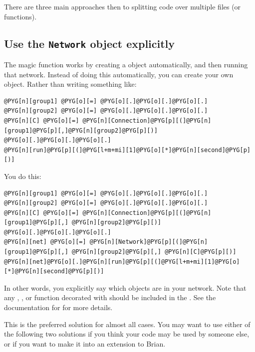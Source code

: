 \documentclass[letterpaper,10pt,english]{manual}
\begin{document}
There are three main approaches then to splitting code over multiple
files (or functions).

\hypertarget{index-120}{}\subsection{Use the \texttt{Network} object explicitly}

The magic \hyperlink{brian.run}{} function works by creating a \hyperlink{brian.Network}{}
object automatically, and then running that network. Instead of doing
this automatically, you can create your own \hyperlink{brian.Network}{} object.
Rather than writing something like:

\begin{Verbatim}[commandchars=@\[\]]
@PYG[n][group1] @PYG[o][=] @PYG[o][.]@PYG[o][.]@PYG[o][.]
@PYG[n][group2] @PYG[o][=] @PYG[o][.]@PYG[o][.]@PYG[o][.]
@PYG[n][C] @PYG[o][=] @PYG[n][Connection]@PYG[p][(]@PYG[n][group1]@PYG[p][,]@PYG[n][group2]@PYG[p][)]
@PYG[o][.]@PYG[o][.]@PYG[o][.]
@PYG[n][run]@PYG[p][(]@PYG[l+m+mi][1]@PYG[o][*]@PYG[n][second]@PYG[p][)]
\end{Verbatim}

You do this:

\begin{Verbatim}[commandchars=@\[\]]
@PYG[n][group1] @PYG[o][=] @PYG[o][.]@PYG[o][.]@PYG[o][.]
@PYG[n][group2] @PYG[o][=] @PYG[o][.]@PYG[o][.]@PYG[o][.]
@PYG[n][C] @PYG[o][=] @PYG[n][Connection]@PYG[p][(]@PYG[n][group1]@PYG[p][,] @PYG[n][group2]@PYG[p][)]
@PYG[o][.]@PYG[o][.]@PYG[o][.]
@PYG[n][net] @PYG[o][=] @PYG[n][Network]@PYG[p][(]@PYG[n][group1]@PYG[p][,] @PYG[n][group2]@PYG[p][,] @PYG[n][C]@PYG[p][)]
@PYG[n][net]@PYG[o][.]@PYG[n][run]@PYG[p][(]@PYG[l+m+mi][1]@PYG[o][*]@PYG[n][second]@PYG[p][)]
\end{Verbatim}

In other words, you explicitly say which objects are in your network.
Note that any \hyperlink{brian.NeuronGroup}{}, \hyperlink{brian.Connection}{},  or
function decorated with \hyperlink{brian.network_operation}{} should be included in the
\hyperlink{brian.Network}{}. See the documentation for \hyperlink{brian.Network}{} for more details.

This is the preferred solution for almost all cases. You may want to use either
of the following two solutions if you think your code may be used by someone
else, or if you want to make it into an extension to Brian.
\end{document}
